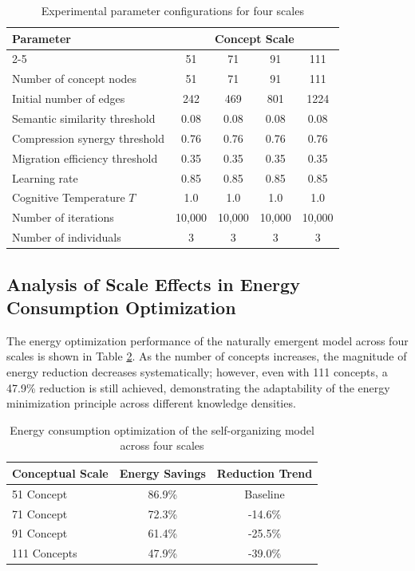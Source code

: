 \documentclass[10pt,onecolumn]{article}
\begin{document}
\begin{table}[H]
\small
\centering
\caption{Experimental parameter configurations for four scales}
\label{tab:multi_scale_config}
\begin{tabular}{lcccc}
\toprule
\textbf{Parameter} & \multicolumn{4}{c}{\textbf{Concept Scale}} \\
\cmidrule(lr){2-5}
& 51 & 71 & 91 & 111 \\
\midrule
Number of concept nodes & 51 & 71 & 91 & 111 \\
Initial number of edges & 242 & 469 & 801 & 1224 \\
Semantic similarity threshold & 0.08 & 0.08 & 0.08 & 0.08 \\
Compression synergy threshold & 0.76 & 0.76 & 0.76 & 0.76 \\
Migration efficiency threshold & 0.35 & 0.35 & 0.35 & 0.35 \\
Learning rate & 0.85 & 0.85 & 0.85 & 0.85 \\
Cognitive Temperature $T$ & 1.0 & 1.0 & 1.0 & 1.0 \\
Number of iterations & 10,000 & 10,000 & 10,000 & 10,000 \\
Number of individuals & 3 & 3 & 3 & 3 \\
\bottomrule
\end{tabular}
\end{table}

\subsection{Analysis of Scale Effects in Energy Consumption Optimization}

The energy optimization performance of the naturally emergent model across four scales is shown in Table \ref{tab:multi_scale_energy}. As the number of concepts increases, the magnitude of energy reduction decreases systematically; however, even with 111 concepts, a 47.9\% reduction is still achieved, demonstrating the adaptability of the energy minimization principle across different knowledge densities.

\begin{table}[h]
\centering
\caption{Energy consumption optimization of the self-organizing model across four scales}
\label{tab:multi_scale_energy}
\begin{tabular}{lcc}
\toprule
\textbf{Conceptual Scale} & \textbf{Energy Savings} & \textbf{Reduction Trend} \\
\midrule
51 Concept & 86.9\% & Baseline \\
71 Concept & 72.3\% & -14.6\% \\
91 Concept & 61.4\% & -25.5\% \\
111 Concepts & 47.9\% & -39.0\% \\
\bottomrule
\end{tabular}
\end{table}
\end{document}
